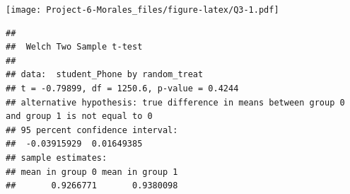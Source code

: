 \documentclass[
]{article}
\newenvironment{Shaded}{\begin{snugshade}}{\end{snugshade}}
\newcommand{\AttributeTok}[1]{\textcolor[rgb]{0.13,0.29,0.53}{#1}}
\newcommand{\CommentTok}[1]{\textcolor[rgb]{0.56,0.35,0.01}{\textit{#1}}}
\newcommand{\FunctionTok}[1]{\textcolor[rgb]{0.13,0.29,0.53}{\textbf{#1}}}
\newcommand{\NormalTok}[1]{#1}
\newcommand{\OtherTok}[1]{\textcolor[rgb]{0.56,0.35,0.01}{#1}}
\newcommand{\SpecialCharTok}[1]{\textcolor[rgb]{0.81,0.36,0.00}{\textbf{#1}}}
\begin{document}
\texttt{[image: Project-6-Morales\_files/figure-latex/Q3-1.pdf]}

\begin{Shaded}
\end{Shaded}

\begin{verbatim}
## 
##  Welch Two Sample t-test
## 
## data:  student_Phone by random_treat
## t = -0.79899, df = 1250.6, p-value = 0.4244
## alternative hypothesis: true difference in means between group 0 and group 1 is not equal to 0
## 95 percent confidence interval:
##  -0.03915929  0.01649385
## sample estimates:
## mean in group 0 mean in group 1 
##       0.9266771       0.9380098
\end{verbatim}
\end{document}
